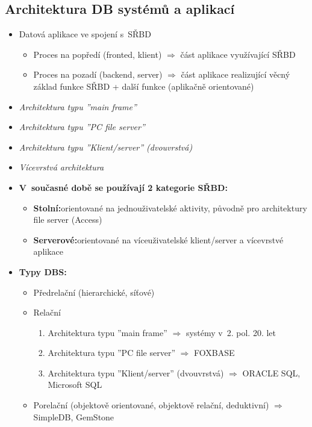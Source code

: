 \documentclass[a4paper,10pt]{article}
\newcommand{\pojem}[2]{\item \textbf{#1:}\quad #2}
\newcommand{\tedy}{$\Rightarrow$ }
\begin{document}
      \subsection{Architektura DB systémů a aplikací}
        \begin{itemize}
          \item Datová aplikace ve spojení s~SŘBD
          \begin{itemize}
            \item Proces na popředí (fronted, klient) \tedy část aplikace využívající SŘBD
            \item Proces na pozadí (backend, server) \tedy část aplikace realizující věcný základ funkce SŘBD + další funkce (aplikačně orientované)
          \end{itemize}

          \item \emph{Architektura typu ''main frame''}
          \item \emph{Architektura typu ''PC file server''}
          \item \emph{Architektura typu ''Klient/server'' (dvouvrstvá)}
          \item \emph{Vícevrstvá architektura}

          \pojem{V~současné době se používají 2 kategorie SŘBD}
          \begin{itemize}
            \pojem{Stolní}{orientované na jednouživatelské aktivity, původně pro architektury file server (Access)}
            \pojem{Serverové}{orientované na víceuživatelské klient/server a vícevrstvé aplikace}
          \end{itemize}

          \pojem{Typy DBS}
          \begin{itemize}
            \item Předrelační (hierarchické, síťové)
            \item Relační
            \begin{enumerate}
              \item Architektura typu ''main frame'' \tedy systémy v~2. pol. 20. let
              \item Architektura typu ''PC file server'' \tedy FOXBASE
              \item Architektura typu ''Klient/server'' (dvouvrstvá) \tedy ORACLE SQL, Microsoft SQL
            \end{enumerate}
            \item Porelační (objektově orientované, objektově relační, deduktivní) \tedy SimpleDB, GemStone
          \end{itemize}
        \end{itemize}
\end{document}
